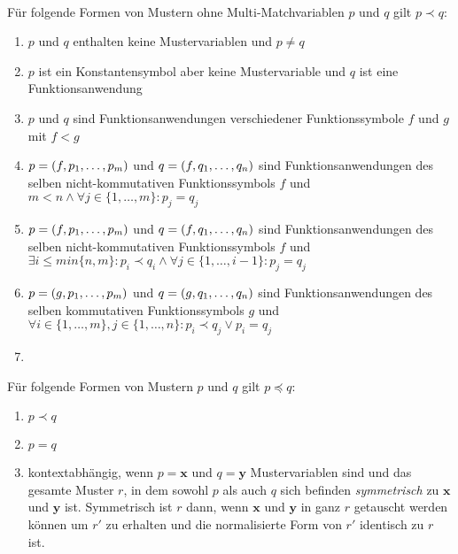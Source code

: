 \begin{lemma}~\\
Für folgende Formen von Mustern ohne Multi-Matchvariablen $p$ und $q$ gilt $p \prec q$:
\begin{enumerate}
	\item{$p$ und $q$ enthalten keine Mustervariablen und $p \neq q$}
	
	\item{$p$ ist ein Konstantensymbol aber keine Mustervariable und $q$ ist eine Funktionsanwendung}
	
	\item{$p$ und $q$ sind Funktionsanwendungen verschiedener Funktionssymbole $f$ und $g$ mit $f < g$}
	
	\item{$p = (f, {p}_{1}, \dots, {p}_{m})$ und $q = (f, {q}_{1}, \dots, {q}_{n})$ sind Funktionsanwendungen des selben nicht-kommutativen Funktionssymbols $f$ und $m < n \land \forall j \in \{1, \dots, m\} \colon p_j = q_j$}
	
	\item{$p = (f, {p}_{1}, \dots, {p}_{m})$ und $q = (f, {q}_{1}, \dots, {q}_{n})$ sind Funktionsanwendungen des selben nicht-kommutativen Funktionssymbols $f$ und $\exists i \leq min\{n, m\} \colon p_i \prec q_i \land \forall j \in \{1, \dots, i  - 1\} \colon p_j = q_j$}
	
	\item{$p = (g, {p}_{1}, \dots, {p}_{m})$ und $q = (g, {q}_{1}, \dots, {q}_{n})$ sind Funktionsanwendungen des selben kommutativen Funktionssymbols $g$ und $\forall i \in \{1, \dots, m\}, j \in \{1, \dots, n\} \colon p_i \prec q_j \lor p_i = q_j$}
	
	\item{}
\end{enumerate}
\end{lemma}



Für folgende Formen von Mustern $p$ und $q$ gilt $p \preceq q$:
\begin{enumerate}
	\item{$p \prec q$}
	
	\item{$p = q$}
	
	\item{kontextabhängig, wenn $p = \mathbf x$ und $q = \mathbf y$ Mustervariablen sind und das gesamte Muster $r$, in dem sowohl $p$ als auch $q$ sich befinden \emph{symmetrisch} zu $\mathbf x$ und $\mathbf y$ ist. Symmetrisch ist $r$ dann, wenn $\mathbf x$ und $\mathbf y$ in ganz $r$ getauscht werden können um $r'$ zu erhalten und die normalisierte Form von $r'$ identisch zu $r$ ist.}
\end{enumerate}

